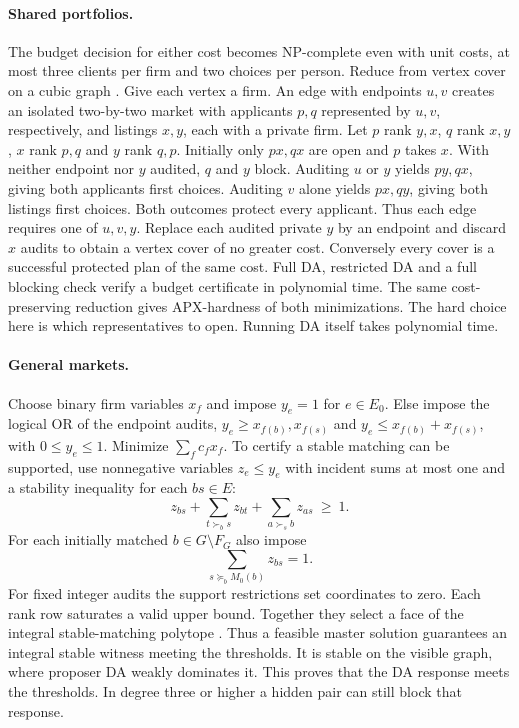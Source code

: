 \paragraph{Shared portfolios.}
The budget decision for either cost becomes NP-complete even with unit costs, at most three clients per firm and two choices per person. Reduce from vertex cover on a cubic graph \cite{alimonti2000}. Give each vertex a firm. An edge with endpoints $u,v$ creates an isolated two-by-two market with applicants $p,q$ represented by $u,v$, respectively, and listings $x,y$, each with a private firm. Let $p$ rank $y,x$, $q$ rank $x,y$, $x$ rank $p,q$ and $y$ rank $q,p$. Initially only $px,qx$ are open and $p$ takes $x$. With neither endpoint nor $y$ audited, $q$ and $y$ block. Auditing $u$ or $y$ yields $py,qx$, giving both applicants first choices. Auditing $v$ alone yields $px,qy$, giving both listings first choices. Both outcomes protect every applicant. Thus each edge requires one of $u,v,y$. Replace each audited private $y$ by an endpoint and discard $x$ audits to obtain a vertex cover of no greater cost. Conversely every cover is a successful protected plan of the same cost. Full DA, restricted DA and a full blocking check verify a budget certificate in polynomial time. The same cost-preserving reduction gives APX-hardness of both minimizations. The hard choice here is which representatives to open. Running DA itself takes polynomial time.

\paragraph{General markets.}
Choose binary firm variables $x_f$ and impose $y_e=1$ for $e\in E_0$. Else impose the logical OR of the endpoint audits, $y_e\geq x_{f(b)},x_{f(s)}$ and $y_e\leq x_{f(b)}+x_{f(s)}$, with $0\le y_e\le1$. Minimize $\sum_f c_fx_f$. To certify a stable matching can be supported, use nonnegative variables $z_e\le y_e$ with incident sums at most one and a stability inequality for each $bs\in E$:
\[
 z_{bs}+\sum_{t\succ_b s}z_{bt}+\sum_{a\succ_s b}z_{as}\ \geq\ 1 .
\]
For each initially matched $b\in G\setminus F_G$ also impose
\begin{equation}
        \sum_{s\succeq_b M_0(b)}z_{bs}=1. \label{eq:rank}
\end{equation}
For fixed integer audits the support restrictions set coordinates to zero. Each rank row saturates a valid upper bound. Together they select a face of the integral stable-matching polytope \cite{rothblum1992polytope}. Thus a feasible master solution guarantees an integral stable witness meeting the thresholds. It is stable on the visible graph, where proposer DA weakly dominates it. This proves that the DA response meets the thresholds. In degree three or higher a hidden pair can still block that response.

